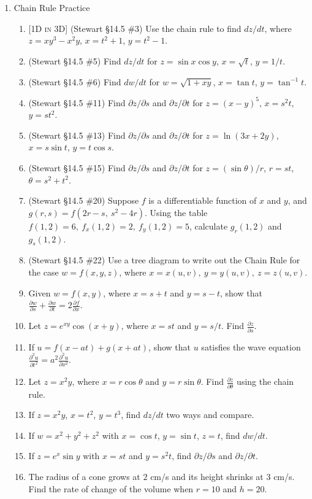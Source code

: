 \documentclass[12pt]{article}
\newcommand{\dimtag}[1]{{\footnotesize\textsc{[#1]}}\;}
\begin{document}
\begin{enumerate}
\item Chain Rule Practice
    \begin{enumerate}
        \item \dimtag{1D in 3D} (Stewart \S14.5 \#3) Use the chain rule to find $dz/dt$, where $z = xy^3 - x^2 y$, $x = t^2 + 1$, $y = t^2 - 1$.
        \item (Stewart \S14.5 \#5) Find $dz/dt$ for $z = \sin x \cos y$, $x = \sqrt{t}$, $y = 1/t$.
        \item (Stewart \S14.5 \#6) Find $dw/dt$ for $w = \sqrt{1+xy}$, $x = \tan t$, $y = \tan^{-1} t$.
        \item (Stewart \S14.5 \#11) Find $\partial z/\partial s$ and $\partial z/\partial t$ for $z = (x-y)^5$, $x = s^2 t$, $y = st^2$.
        \item (Stewart \S14.5 \#13) Find $\partial z/\partial s$ and $\partial z/\partial t$ for $z = \ln(3x+2y)$, $x = s\sin t$, $y = t\cos s$.
        \item (Stewart \S14.5 \#15) Find $\partial z/\partial s$ and $\partial z/\partial t$ for $z = (\sin\theta)/r$, $r=st$, $\theta = s^2 + t^2$.
        \item (Stewart \S14.5 \#20) Suppose $f$ is a differentiable function of $x$ and $y$, and $g(r,s) = f(2r - s,\ s^2 - 4r)$. Using the table $f(1,2)=6,\ f_x(1,2)=2,\ f_y(1,2)=5$, calculate $g_r(1,2)$ and $g_s(1,2)$.
        \item (Stewart \S14.5 \#22) Use a tree diagram to write out the Chain Rule for the case $w = f(x,y,z)$, where $x = x(u,v),\ y = y(u,v),\ z = z(u,v)$.
        \item Given $w = f(x, y)$, where $x = s+t$ and $y = s-t$, show that $\frac{\partial w}{\partial s} + \frac{\partial w}{\partial t} = 2\frac{\partial f}{\partial x}$.
        \item Let $z = e^{xy} \cos(x+y)$, where $x = st$ and $y = s/t$. Find $\frac{\partial z}{\partial s}$.
        \item If $u = f(x-at) + g(x+at)$, show that $u$ satisfies the wave equation $\frac{\partial^2 u}{\partial t^2} = a^2 \frac{\partial^2 u}{\partial x^2}$.
        \item Let $z = x^2 y$, where $x = r\cos\theta$ and $y = r\sin\theta$. Find $\frac{\partial z}{\partial \theta}$ using the chain rule.
        \item If $z=x^2 y$, $x=t^2$, $y=t^3$, find $dz/dt$ two ways and compare.
        \item If $w=x^2+y^2+z^2$ with $x=\cos t$, $y=\sin t$, $z=t$, find $dw/dt$.
        \item If $z=e^{x}\sin y$ with $x=st$ and $y=s^2 t$, find $\partial z/\partial s$ and $\partial z/\partial t$.
        \item The radius of a cone grows at $2$ cm/s and its height shrinks at $3$ cm/s. Find the rate of change of the volume when $r=10$ and $h=20$.
    \end{enumerate}
\newpage


\end{enumerate}
\end{document}
